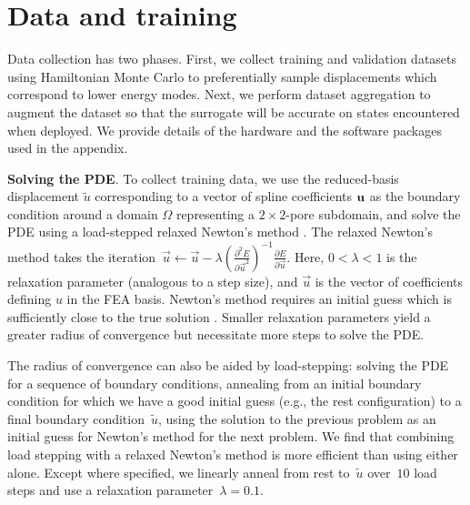 \vspace{-0.1cm}\section{Data and training}\label{sec:training}\vspace{-0.1cm}
Data collection has two phases.
First, we collect training and validation datasets using Hamiltonian Monte Carlo \citep{duane1987hybrid} to preferentially sample displacements which correspond to lower energy modes.
Next, we perform dataset aggregation \citep{ross2011reduction} to augment the dataset so that the surrogate will be accurate
on states encountered when deployed.
We provide details of the hardware and the software packages used in the appendix.

\textbf{Solving the PDE}.
To collect training data, we use the reduced-basis displacement $\tilde{u}$ corresponding to a vector of spline coefficients ${\mathbf{u}}$ as the boundary condition around a domain $\Omega$ representing a $2\times2$-pore subdomain, and solve the PDE using a load-stepped relaxed Newton's method \citep{sheng2002automatic}. The relaxed Newton's method takes the iteration~${\vec{u} \leftarrow \vec{u} - \lambda
(\frac{\partial^2 E}{\partial \vec{u}^2})^{-1}\frac{\partial E}{\partial \vec{u}}}$.
Here, $0 < \lambda < 1$ is the relaxation parameter (analogous to a step size), and $\vec{u}$ is the vector of coefficients defining $u$ in the FEA basis.
Newton's method requires an initial guess which is sufficiently close to the true solution \citep{kythe2004introduction}.
Smaller relaxation parameters yield a greater radius of convergence but necessitate more steps to solve the PDE.

The radius of convergence can also be aided by load-stepping: solving the PDE for a sequence of boundary conditions, annealing from an initial boundary condition for which we have a good initial guess (e.g., the rest configuration) to a final boundary condition~$\tilde{u}$, using the solution to the previous problem as an initial guess for Newton's method for the next problem.
We find that combining load stepping with a relaxed Newton's method is more efficient than using either alone.
Except where specified, we linearly anneal from rest to~$\tilde{u}$ over~$10$ load steps and use a relaxation parameter~$\lambda = 0.1$.

